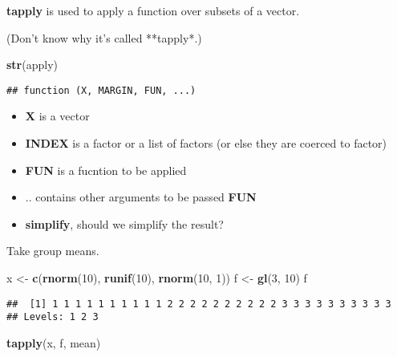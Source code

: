 \documentclass[
]{article}
\newenvironment{Shaded}{\begin{snugshade}}{\end{snugshade}}
\newcommand{\DecValTok}[1]{\textcolor[rgb]{0.00,0.00,0.81}{#1}}
\newcommand{\KeywordTok}[1]{\textcolor[rgb]{0.13,0.29,0.53}{\textbf{#1}}}
\newcommand{\NormalTok}[1]{#1}
\newcommand{\StringTok}[1]{\textcolor[rgb]{0.31,0.60,0.02}{#1}}
\providecommand{\tightlist}{%
  \setlength{\itemsep}{0pt}\setlength{\parskip}{0pt}}
\begin{document}
\textbf{tapply} is used to apply a function over subsets of a vector.

(Don't know why it's called **tapply*.)

\begin{Shaded}
\begin{Highlighting}[]
\KeywordTok{str}\NormalTok{(apply)}
\end{Highlighting}
\end{Shaded}

\begin{verbatim}
## function (X, MARGIN, FUN, ...)
\end{verbatim}

\begin{itemize}
\tightlist
\item
  \textbf{X} is a vector
\item
  \textbf{INDEX} is a factor or a list of factors (or else they are
  coerced to factor)
\item
  \textbf{FUN} is a fucntion to be applied
\item
  .. contains other arguments to be passed \textbf{FUN}
\item
  \textbf{simplify}, should we simplify the result?
\end{itemize}

Take group means.

\begin{Shaded}
\begin{Highlighting}[]
\NormalTok{x \textless{}{-}}\StringTok{ }\KeywordTok{c}\NormalTok{(}\KeywordTok{rnorm}\NormalTok{(}\DecValTok{10}\NormalTok{), }\KeywordTok{runif}\NormalTok{(}\DecValTok{10}\NormalTok{), }\KeywordTok{rnorm}\NormalTok{(}\DecValTok{10}\NormalTok{, }\DecValTok{1}\NormalTok{))}
\NormalTok{f \textless{}{-}}\StringTok{ }\KeywordTok{gl}\NormalTok{(}\DecValTok{3}\NormalTok{, }\DecValTok{10}\NormalTok{)}
\NormalTok{f}
\end{Highlighting}
\end{Shaded}

\begin{verbatim}
##  [1] 1 1 1 1 1 1 1 1 1 1 2 2 2 2 2 2 2 2 2 2 3 3 3 3 3 3 3 3 3 3
## Levels: 1 2 3
\end{verbatim}

\begin{Shaded}
\begin{Highlighting}[]
\KeywordTok{tapply}\NormalTok{(x, f, mean)}
\end{Highlighting}
\end{Shaded}
\end{document}
